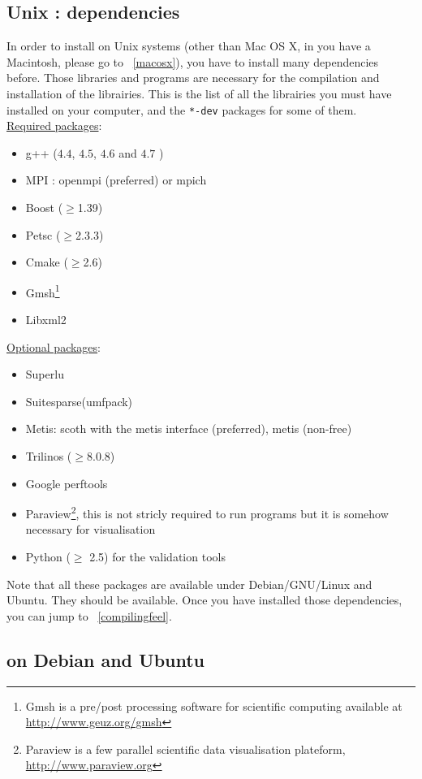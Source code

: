 \subsection{Unix : dependencies}
\label{sec:about-dependencies}

In order to install \feel on Unix systems (other than Mac OS X, in you have a Macintosh, please go to ~\ref{macosx}), you have to install many dependencies
before. Those libraries and programs are necessary for the
compilation and installation of the \feel librairies.
This is the list of all the librairies you must have installed on your
computer, and the \lstinline|*-dev| packages for some of them. \\
\underline{Required packages}:
\begin{itemize}
\item g++ ($4.4$, $4.5$, $4.6$ and $4.7$  )
\item MPI : openmpi (preferred) or mpich
\item Boost ($\geq$1.39)
\item Petsc ($\geq$2.3.3)
\item Cmake ($\geq$2.6)
\item Gmsh\footnote{Gmsh is a pre/post processing software for scientific
computing available at \url{http://www.geuz.org/gmsh}}
\item Libxml2
\end{itemize}
\underline{Optional packages}:
\begin{itemize}
\item Superlu
\item Suitesparse(umfpack)
\item Metis: scoth with the metis interface (preferred), metis (non-free)
\item Trilinos ($\geq$8.0.8)
\item Google perftools
\item Paraview\footnote{Paraview is a few parallel scientific data
    visualisation plateform, \url{http://www.paraview.org}}, this is
  not stricly required to run \feel programs but it is somehow
  necessary for visualisation
\item Python ($\geq$ 2.5) for the validation tools
\end{itemize}
Note that all these packages are available under Debian/GNU/Linux and
Ubuntu. They should be available. Once you have installed those dependencies, you can jump to ~\ref{compilingfeel}.

\subsection{\feel on Debian and Ubuntu}
\label{sec:feel-debian-ubuntu}

